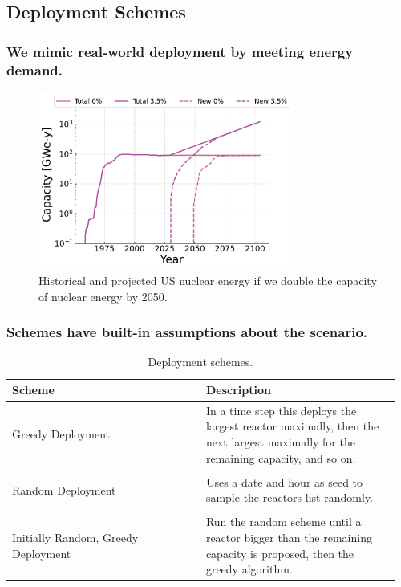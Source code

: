 \documentclass[9pt]{beamer}
\begin{document}
  \subsection{Deployment Schemes}
  \begin{frame}
    \frametitle{We mimic real-world deployment by meeting energy demand.}
    \begin{figure}
      \centering
      \includegraphics[width=0.75\textwidth]{images/new_capacity_ng_d2.pdf}
      \caption{Historical and projected US nuclear energy if we double the capacity of nuclear energy by 2050.}
    \end{figure}
  \end{frame}

  \begin{frame}
    \frametitle{Schemes have built-in assumptions about the scenario.}
    \begin{table}[H]
      \centering
      \caption{Deployment schemes.}
      \label{tab:deployment_schemes}
      \newcommand{\ColWidth}{0.48\linewidth}
      \begin{tabular}{p{\ColWidth} p{\ColWidth}}
          \hline
          Scheme & Description \\
          \hline
          Greedy Deployment & In a time step this deploys the largest
          reactor maximally, then the next largest maximally for the remaining capacity, and so on. \\
          \vspace{1.5mm}\\
          Random Deployment & Uses a date and hour as seed to sample the
          reactors list randomly. \\
          \vspace{1.5mm}\\
          Initially Random, Greedy Deployment & Run the random scheme until
          a reactor bigger than the remaining capacity is proposed,
          then the greedy algorithm. \\
          \hline
      \end{tabular}
    \end{table}
  \end{frame}
\end{document}
